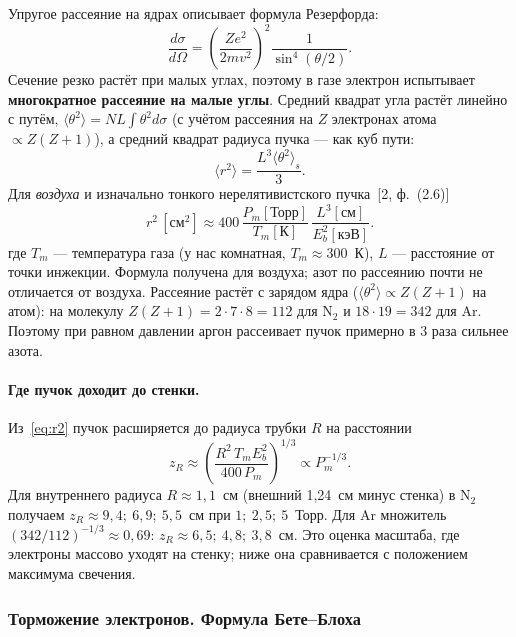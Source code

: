 \documentclass[12pt,a4paper]{article}
\newcommand{\Nt}{\mathrm{N_2}}
\begin{document}
Упругое рассеяние на ядрах описывает формула Резерфорда:
\begin{equation}
    \frac{d\sigma}{d\Omega}
    = \left(\frac{Ze^2}{2mv^2}\right)^{\!2}\frac{1}{\sin^4(\theta/2)} .
    \label{eq:ruth}
\end{equation}
Сечение резко растёт при малых углах, поэтому в газе электрон испытывает
\textbf{многократное рассеяние на малые углы}. Средний квадрат угла
растёт линейно с путём, $\langle\theta^2\rangle = N L \int\theta^2 d\sigma$
(с учётом рассеяния на $Z$ электронах атома $\propto Z(Z+1)$), а средний
квадрат радиуса пучка --- как куб пути:
\begin{equation}
    \langle r^2\rangle = \frac{L^3\langle\theta^2\rangle_s}{3} .
\end{equation}
Для \emph{воздуха} и изначально тонкого нерелятивистского пучка~[2, ф.~(2.6)]
\begin{equation}
    r^2\,[\text{см}^2] \approx 400\,\frac{P_m[\text{Торр}]}{T_m[\text{К}]}\,
    \frac{L^3[\text{см}]}{E_b^2[\text{кэВ}]} .
    \label{eq:r2}
\end{equation}
где $T_m$ --- температура газа (у нас комнатная, $T_m \approx 300$~К),
$L$ --- расстояние от точки инжекции. Формула получена для воздуха;
азот по рассеянию почти не отличается от воздуха. Рассеяние растёт с
зарядом ядра ($\langle\theta^2\rangle \propto Z(Z+1)$ на атом): на
молекулу $Z(Z+1) = 2\cdot 7\cdot 8 = 112$ для $\Nt$ и $18\cdot 19 = 342$
для Ar. Поэтому при равном давлении аргон рассеивает пучок примерно в
3 раза сильнее азота.

\paragraph{Где пучок доходит до стенки.} Из~\eqref{eq:r2} пучок
расширяется до радиуса трубки $R$ на расстоянии
\begin{equation}
    z_R \approx \left(\frac{R^2\,T_m E_b^2}{400\,P_m}\right)^{1/3}
    \propto P_m^{-1/3}.
    \label{eq:zR}
\end{equation}
Для внутреннего радиуса $R \approx 1{,}1$~см (внешний 1,24~см минус
стенка) в $\Nt$ получаем $z_R \approx 9{,}4;\ 6{,}9;\ 5{,}5$~см при
$1;\ 2{,}5;\ 5$~Торр. Для Ar множитель $(342/112)^{-1/3} \approx 0{,}69$:
$z_R \approx 6{,}5;\ 4{,}8;\ 3{,}8$~см. Это оценка масштаба, где электроны
массово уходят на стенку; ниже она сравнивается с положением максимума
свечения.

\subsubsection{Торможение электронов. Формула Бете--Блоха}\label{sec:bethe}
\end{document}
